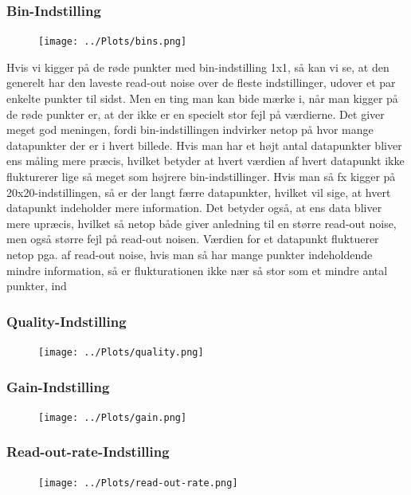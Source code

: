 \documentclass[working]{tuftebook}
\begin{document}
\subsubsection*{Bin-Indstilling}
\begin{figure}[ht]
\centering
{}
\texttt{[image: ../Plots/bins.png]}	
\end{figure}
Hvis vi kigger på de røde punkter med bin-indstilling 1x1, så kan vi se, at den generelt har den laveste read-out noise over de fleste indstillinger, udover et par enkelte punkter til sidst. Men en ting man kan bide mærke i, når man kigger på de røde punkter er, at der ikke er en specielt stor fejl på værdierne. Det giver meget god meningen, fordi bin-indstillingen indvirker netop på hvor mange datapunkter der er i hvert billede. Hvis man har et højt antal datapunkter bliver ens måling mere præcis, hvilket betyder at hvert værdien af hvert datapunkt ikke flukturerer lige så meget som højrere bin-indstillinger. Hvis man så fx kigger på 20x20-indstillingen, så er der langt færre datapunkter, hvilket vil sige, at hvert datapunkt indeholder mere information. Det betyder også, at ens data bliver mere upræcis, hvilket så netop både giver anledning til en større read-out noise, men også større fejl på read-out noisen. Værdien for et datapunkt fluktuerer netop pga. af read-out noise, hvis man så har mange punkter indeholdende mindre information, så er flukturationen ikke nær så stor som et mindre antal punkter, ind
\subsubsection*{Quality-Indstilling}
\begin{figure}[ht]
\centering
{}
\texttt{[image: ../Plots/quality.png]}	
\end{figure}

\subsubsection*{Gain-Indstilling}
\begin{figure}[ht]
\centering
{}
\texttt{[image: ../Plots/gain.png]}	
\end{figure}

\subsubsection*{Read-out-rate-Indstilling}
\begin{figure}[ht]
\centering
{}
\texttt{[image: ../Plots/read-out-rate.png]}	

\end{figure}
\end{document}
